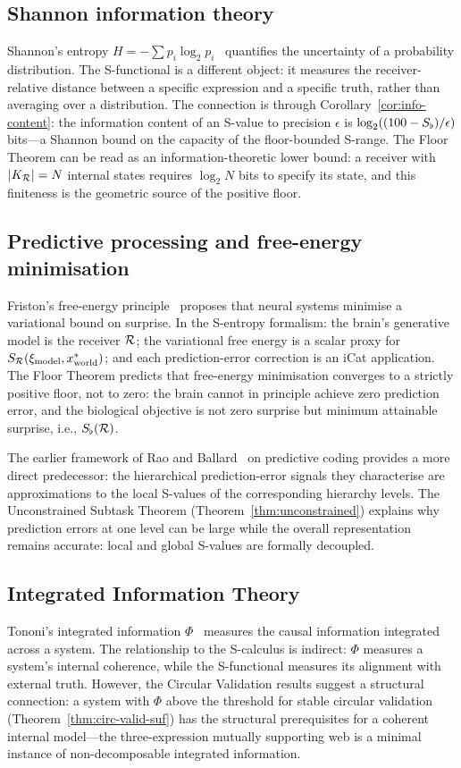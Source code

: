 \subsection*{Shannon information theory}
Shannon's entropy $H = -\sum p_i \log_2 p_i$~\citep{shannon1949} quantifies the uncertainty of a probability distribution. The S-functional is a different object: it measures the receiver-relative distance between a specific expression and a specific truth, rather than averaging over a distribution. The connection is through Corollary~\ref{cor:info-content}: the information content of an S-value to precision $\epsilon$ is $\log_2((100-S_{\flat})/\epsilon)$ bits---a Shannon bound on the capacity of the floor-bounded S-range. The Floor Theorem can be read as an information-theoretic lower bound: a receiver with $|K_{\mathcal{R}}| = N$ internal states requires $\log_2 N$ bits to specify its state, and this finiteness is the geometric source of the positive floor.

\subsection*{Predictive processing and free-energy minimisation}
Friston's free-energy principle~\citep{friston2010} proposes that neural systems minimise a variational bound on surprise. In the S-entropy formalism: the brain's generative model is the receiver $\mathcal{R}$; the variational free energy is a scalar proxy for $S_{\mathcal{R}}(\xi_{\mathrm{model}}, x^*_{\mathrm{world}})$; and each prediction-error correction is an iCat application. The Floor Theorem predicts that free-energy minimisation converges to a strictly positive floor, not to zero: the brain cannot in principle achieve zero prediction error, and the biological objective is not zero surprise but minimum attainable surprise, i.e., $S_{\flat}(\mathcal{R})$.

The earlier framework of Rao and Ballard~\citep{rao1999} on predictive coding provides a more direct predecessor: the hierarchical prediction-error signals they characterise are approximations to the local S-values of the corresponding hierarchy levels. The Unconstrained Subtask Theorem (Theorem~\ref{thm:unconstrained}) explains why prediction errors at one level can be large while the overall representation remains accurate: local and global S-values are formally decoupled.

\subsection*{Integrated Information Theory}
Tononi's integrated information $\Phi$~\citep{tononi2008} measures the causal information integrated across a system. The relationship to the S-calculus is indirect: $\Phi$ measures a system's internal coherence, while the S-functional measures its alignment with external truth. However, the Circular Validation results suggest a structural connection: a system with $\Phi$ above the threshold for stable circular validation (Theorem~\ref{thm:circ-valid-suf}) has the structural prerequisites for a coherent internal model---the three-expression mutually supporting web is a minimal instance of non-decomposable integrated information.

